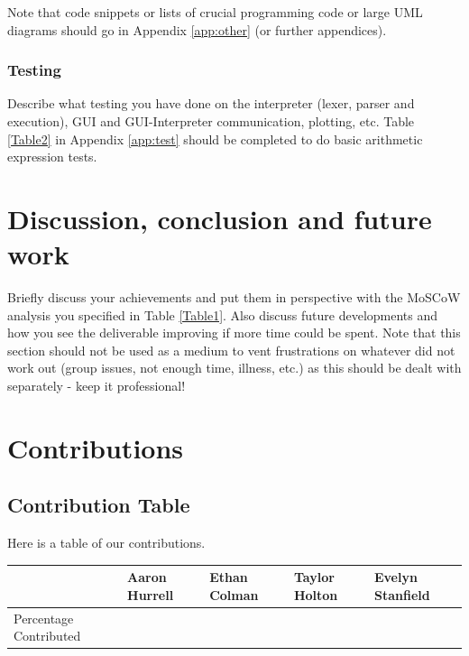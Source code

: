 \documentclass[a4paper, oneside, 11pt]{report}
\begin{document}
    Note that code snippets or lists of crucial programming code or large UML diagrams should go in Appendix \ref{app:other} (or further appendices).

    \subsection{Testing}

    Describe what testing you have done on the interpreter (lexer, parser and execution), GUI and GUI-Interpreter communication, plotting, etc. Table \ref{Table2} in Appendix \ref{app:test} should be completed to do basic arithmetic expression tests.


    \chapter{Discussion, conclusion and future work}

    Briefly discuss your achievements and put them in perspective with the MoSCoW analysis you specified in Table \ref{Table1}. Also discuss future developments and how you see the deliverable improving if more time could be spent. Note that this section should not be used as a medium to vent frustrations on whatever did not work out (group issues, not enough time, illness, etc.) as this should be dealt with separately - keep it professional!


    
    


    \appendix
    \chapter{Contributions}
    \section{Contribution Table}
    Here is a table of our contributions. \\

    \begin{table}[h]
        \begin{tabular}{|l|l|l|l|l|}
            \hline
            & Aaron Hurrell & Ethan Colman & Taylor Holton & Evelyn Stanfield \\ \hline
            Percentage Contributed &               &              &               &                  \\ \hline
        \end{tabular}
    \end{table}
\end{document}
